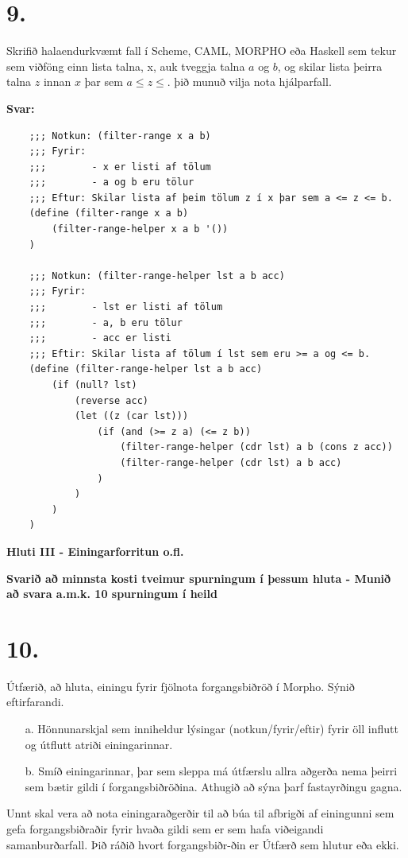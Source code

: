 \documentclass{article}
\newcommand{\sv}{\textbf{Svar:}}
\newcommand{\bo}[1]{\textbf{#1}}
\begin{document}
     \newpage
     \section{9.}
     Skrifið halaendurkvæmt fall í Scheme, CAML, MORPHO eða Haskell
     sem tekur sem viðföng einn lista talna, x, auk tveggja talna $a$ og $b$,
     og skilar lista þeirra talna $z$ innan $x$ þar sem $a \leq z \leq$. þið munuð 
     vilja nota hjálparfall.


     \sv 


    \begin{lstlisting}
    ;;; Notkun: (filter-range x a b)
    ;;; Fyrir: 
    ;;;        - x er listi af tölum
    ;;;        - a og b eru tölur  
    ;;; Eftur: Skilar lista af þeim tölum z í x þar sem a <= z <= b.
    (define (filter-range x a b)
        (filter-range-helper x a b '())
    )

    ;;; Notkun: (filter-range-helper lst a b acc)
    ;;; Fyrir:
    ;;;        - lst er listi af tölum
    ;;;        - a, b eru tölur 
    ;;;        - acc er listi
    ;;; Eftir: Skilar lista af tölum í lst sem eru >= a og <= b.
    (define (filter-range-helper lst a b acc)
        (if (null? lst)
            (reverse acc)
            (let ((z (car lst)))
                (if (and (>= z a) (<= z b))
                    (filter-range-helper (cdr lst) a b (cons z acc))
                    (filter-range-helper (cdr lst) a b acc)
                )
            )
        )
    )

    \end{lstlisting}

     \newpage

     \begin{center}
     \bo{Hluti III - Einingarforritun o.fl.}

     \bo{Svarið að minnsta kosti tveimur spurningum í þessum hluta - Munið að svara a.m.k. 10 spurningum í heild}
     \end{center}


     \section{10.}
     Útfærið, að hluta, einingu fyrir fjölnota forgangsbiðröð í Morpho.
     Sýnið eftirfarandi.
     \begin{itemize}
        \item[a.] Hönnunarskjal sem inniheldur lýsingar (notkun/fyrir/eftir) fyrir
                  öll influtt og útflutt atriði einingarinnar.
        \item[b.] Smíð einingarinnar, þar sem sleppa má útfærslu allra 
                  aðgerða nema þeirri sem bætir gildi í forgangsbiðröðina.
                  Athugið að sýna þarf fastayrðingu gagna.
                  
     \end{itemize}
     Unnt skal vera að nota einingaraðgerðir til að búa til afbrigði af 
     einingunni sem gefa forgangsbiðraðir fyrir hvaða gildi sem er sem
     hafa viðeigandi samanburðarfall. Þið ráðið hvort forgangsbiðr-ðin er
     Útfærð sem hlutur eða ekki.
\end{document}
